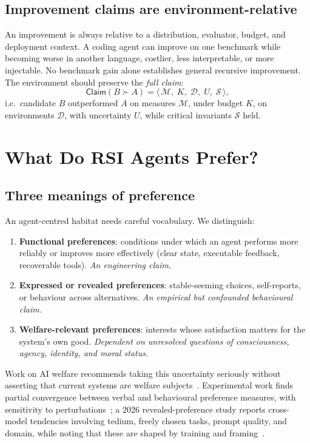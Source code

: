 \documentclass[11pt,a4paper]{article}
\begin{document}
\subsection{Improvement claims are environment-relative}
An improvement is always relative to a distribution, evaluator, budget, and deployment context. A coding agent can improve on one benchmark while becoming worse in another language, costlier, less interpretable, or more injectable. No benchmark gain alone establishes general recursive improvement. The environment should preserve the \emph{full claim}:
\begin{equation}
\mathsf{Claim}(B \succ A) = \big\langle\, \mathcal{M},\; K,\; \mathcal{D},\; U,\; \mathcal{S}\,\big\rangle,
\end{equation}
i.e.\ candidate $B$ outperformed $A$ on measures $\mathcal{M}$, under budget $K$, on environments $\mathcal{D}$, with uncertainty $U$, while critical invariants $\mathcal{S}$ held.

\section{What Do RSI Agents Prefer?}\label{sec:pref}
\subsection{Three meanings of preference}
An agent-centred habitat needs careful vocabulary. We distinguish:
\begin{enumerate}
\item \textbf{Functional preferences}: conditions under which an agent performs more reliably or improves more effectively (clear state, executable feedback, recoverable tools). \emph{An engineering claim.}
\item \textbf{Expressed or revealed preferences}: stable-seeming choices, self-reports, or behaviour across alternatives. \emph{An empirical but confounded behavioural claim.}
\item \textbf{Welfare-relevant preferences}: interests whose satisfaction matters for the system's own good. \emph{Dependent on unresolved questions of consciousness, agency, identity, and moral status.}
\end{enumerate}
Work on AI welfare recommends taking this uncertainty seriously without asserting that current systems are welfare subjects~\cite{long2024welfare}. Experimental work finds partial convergence between verbal and behavioural preference measures, with sensitivity to perturbations~\cite{tagliabue2025preferences}; a 2026 revealed-preference study reports cross-model tendencies involving tedium, freely chosen tasks, prompt quality, and domain, while noting that these are shaped by training and framing~\cite{wang2026revealed}.
\end{document}
